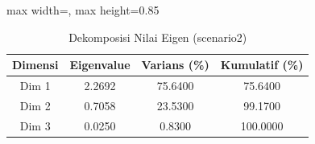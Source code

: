 \begin{table}[H]
\centering
\caption{Dekomposisi Nilai Eigen (scenario2)} \makeatletter{}\makeatother
\begin{adjustbox}{max width=\textwidth, max height=0.85\textheight}
\begin{tabular}{|c|c|c|c|}
\hline
\textbf{Dimensi} & \textbf{Eigenvalue} & \textbf{Varians (\%)} & \textbf{Kumulatif (\%)} \\
\hline
Dim 1 & 2.2692 & 75.6400 & 75.6400 \\
Dim 2 & 0.7058 & 23.5300 & 99.1700 \\
Dim 3 & 0.0250 & 0.8300 & 100.0000 \\
\hline
\end{tabular}
\end{adjustbox}
\end{table}